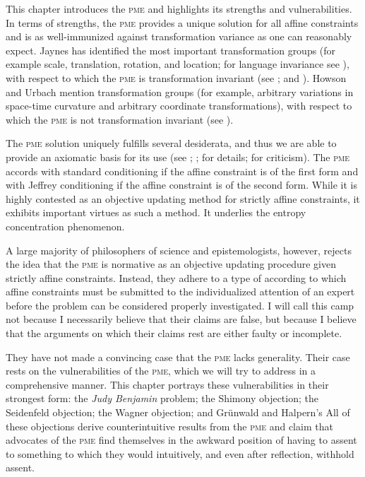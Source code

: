 \documentclass[11pt]{article}
\begin{document}
This chapter introduces the \textsc{pme} and highlights its strengths
and vulnerabilities. In terms of strengths, the \textsc{pme} provides
a unique solution for all affine constraints and is as well-immunized
against transformation variance as one can reasonably expect. Jaynes
has identified the most important transformation groups (for example
scale, translation, rotation, and location; for language invariance
see ), with respect to which the \textsc{pme} is
transformation invariant (see ; and
). Howson and Urbach mention
transformation groups (for example, arbitrary variations in space-time
curvature and arbitrary coordinate transformations), with respect to
which the \textsc{pme} is not transformation invariant (see
).

The \textsc{pme} solution uniquely fulfills several desiderata, and
thus we are able to provide an axiomatic basis for its use (see
; ;
 for details;  for
criticism). The \textsc{pme} accords with standard conditioning if the
affine constraint is of the first form and with Jeffrey conditioning
if the affine constraint is of the second form. While it is highly
contested as an objective updating method for strictly affine
constraints, it exhibits important virtues as such a method. It
underlies the entropy concentration phenomenon. 

A large majority of philosophers of science and epistemologists,
however, rejects the idea that the \textsc{pme} is normative as an
objective updating procedure given strictly affine constraints.
Instead, they adhere to a type of 
according to which affine constraints must be submitted to the
individualized attention of an expert before the problem can be
considered properly investigated. I will call this camp
 not because I necessarily believe that their claims
are false, but because I believe that the arguments on which their
claims rest are either faulty or incomplete. 

They have not made a convincing case that the \textsc{pme} lacks
generality. Their case rests on the vulnerabilities of the
\textsc{pme}, which we will try to address in a comprehensive manner.
This chapter portrays these vulnerabilities in their strongest form:
the \emph{Judy Benjamin} problem; the Shimony objection; the
Seidenfeld objection; the Wagner objection; and Gr{\"u}nwald and
Halpern's  All of these objections derive
counterintuitive results from the \textsc{pme} and claim that
advocates of the \textsc{pme} find themselves in the awkward position
of having to assent to something to which they would intuitively, and
even after reflection, withhold assent.
\end{document}
